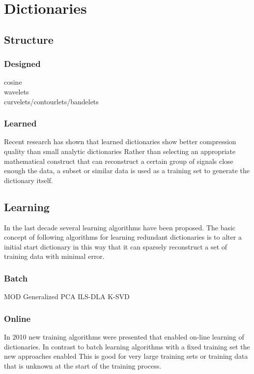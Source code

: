 \chapter{Dictionaries}
\thispagestyle{empty}

\section{Structure}
\subsection{Designed}
\begin{description}
 \item[cosine]
 \item[wavelets]
 \item[curvelets/contourlets/bandelets]
\end{description}

\subsection{Learned}
Recent research has shown that learned dictionaries show better compression quality than small analytic dictionaries \cite{Aharon2006} \cite{Chen1998} 
Rather than selecting an appropriate mathematical construct that can reconstruct a certain group of signals close enough the data, a subset or similar data
is used as a training set to generate the dictionary itself.


\section{Learning}
In the last decade several learning algorithms have been proposed.
The basic concept of following algorithms for learning redundant dictionaries is to alter a initial start dictionary
in this way that it can sparsely reconstruct a set of training data with minimal error. 

\subsection{Batch}
MOD \cite{Engan1999}
Generalized PCA \cite{}
ILS-DLA \cite{}
K-SVD \cite{Aharon2006}


\subsection{Online}
In 2010 new training algorithms were presented that enabled on-line learning of dictionaries. 
In contrast to batch learning algorithms with a fixed training set the new approaches enabled
This is good for very large training sets or training data that is unknown at the start of the training process.

